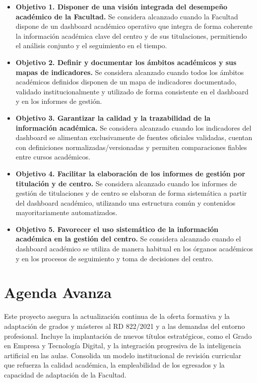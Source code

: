 \documentclass[11pt,a4paper]{scrreprt}
\begin{document}
\begin{itemize}[leftmargin=1.5em,itemsep=6pt,topsep=4pt]

\item \textbf{Objetivo 1. Disponer de una visión integrada del desempeño académico de la Facultad.}  
Se considera alcanzado cuando la Facultad dispone de un dashboard académico operativo que integra de forma coherente la información académica clave del centro y de sus titulaciones, permitiendo el análisis conjunto y el seguimiento en el tiempo.

\item \textbf{Objetivo 2. Definir y documentar los ámbitos académicos y sus mapas de indicadores.}  
Se considera alcanzado cuando todos los ámbitos académicos definidos disponen de un mapa de indicadores documentado, validado institucionalmente y utilizado de forma consistente en el dashboard y en los informes de gestión.

\item \textbf{Objetivo 3. Garantizar la calidad y la trazabilidad de la información académica.}  
Se considera alcanzado cuando los indicadores del dashboard se alimentan exclusivamente de fuentes oficiales validadas, cuentan con definiciones normalizadas/versionadas y permiten comparaciones fiables entre cursos académicos.

\item \textbf{Objetivo 4. Facilitar la elaboración de los informes de gestión por titulación y de centro.}  
Se considera alcanzado cuando los informes de gestión de titulaciones y de centro se elaboran de forma sistemática a partir del dashboard académico, utilizando una estructura común y contenidos mayoritariamente automatizados.

\item \textbf{Objetivo 5. Favorecer el uso sistemático de la información académica en la gestión del centro.}  
Se considera alcanzado cuando el dashboard académico se utiliza de manera habitual en los órganos académicos y en los procesos de seguimiento y toma de decisiones del centro.

\end{itemize}

\clearpage

\chapter[Agenda Avanza]{\textcolor{aacolor}{Agenda Avanza}}
\begin{tcolorbox}[descbox]
\small Este proyecto asegura la actualización continua de la oferta formativa y la adaptación de grados y másteres al RD 822/2021 y a las demandas del entorno profesional. Incluye la implantación de nuevos títulos estratégicos, como el Grado en Empresa y Tecnología Digital, y la integración progresiva de la inteligencia artificial en las aulas. Consolida un modelo institucional de revisión curricular que refuerza la calidad académica, la empleabilidad de los egresados y la capacidad de adaptación de la Facultad.
\end{tcolorbox}
\end{document}
